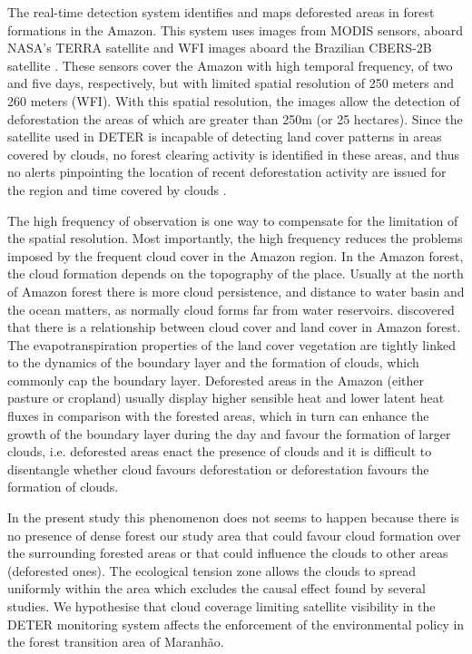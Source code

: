 The real-time detection system identifies and maps deforested areas in forest formations in the Amazon. This system uses images from MODIS sensors, aboard NASA's TERRA satellite and WFI images aboard the Brazilian CBERS-2B satellite \citep{inpe-deter_2018}. These sensors cover the Amazon with high temporal frequency, of two and five days, respectively, but with limited spatial resolution of 250 meters and 260 meters (WFI). With this spatial resolution, the images allow the detection of deforestation the areas of which are greater than 250m (or 25 hectares). Since the satellite used in DETER is incapable of detecting land cover patterns in areas covered by clouds, no forest clearing activity is identified in these areas, and thus no alerts pinpointing the location of recent deforestation activity are issued for the region and time covered by clouds \citep{ASSUNCAO_2017}.

The high frequency of observation is one way to compensate for the limitation of the spatial resolution. Most importantly, the high frequency reduces the problems imposed by the frequent cloud cover in the Amazon region. In the Amazon forest, the cloud formation depends on the topography of the place. Usually at the north of Amazon forest there is more cloud persistence, and distance to water basin and the ocean matters, as normally cloud forms far from water reservoirs. \citet{Wang2004,Koren2004,Wang2009,Pinto2009,Heiblum2014} discovered that there is a relationship between cloud cover and land cover in Amazon forest. The evapotranspiration properties of the land cover vegetation are tightly linked to the dynamics of the boundary layer and the formation of clouds, which commonly cap the boundary layer. Deforested areas in the Amazon (either pasture or cropland) usually display higher sensible heat and lower latent heat fluxes in comparison with the forested areas, which in turn can enhance the growth of the boundary layer during the day and favour the formation of larger clouds, i.e. deforested areas enact the presence of clouds and it is difficult to disentangle whether cloud favours deforestation or deforestation favours the formation of clouds. 

In the present study this phenomenon does not seems to happen because there is no presence of dense forest our study area that could favour cloud formation over the surrounding forested areas or that could influence the clouds to other areas (deforested ones). The ecological tension zone allows the clouds to spread uniformly within the area which excludes the causal effect found by several studies. We hypothesise that cloud coverage limiting satellite visibility in the DETER monitoring system affects the enforcement of the environmental policy in the forest transition area of Maranhão.

